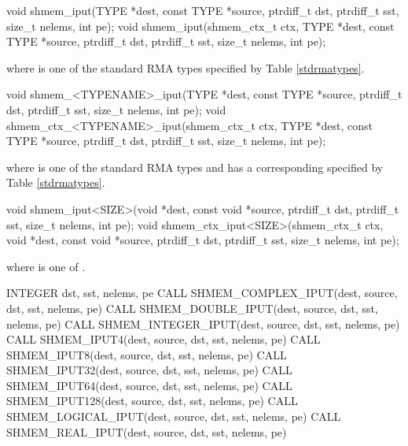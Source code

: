 
\begin{apidefinition}

\begin{C11synopsis}
void shmem_iput(TYPE *dest, const TYPE *source, ptrdiff_t dst, ptrdiff_t sst, size_t nelems, int pe);
void shmem_iput(shmem_ctx_t ctx, TYPE *dest, const TYPE *source, ptrdiff_t dst, ptrdiff_t sst, size_t nelems, int pe);
\end{C11synopsis}
where \TYPE{} is one of the standard \ac{RMA} types specified by Table \ref{stdrmatypes}.

\begin{Csynopsis}
void shmem_<TYPENAME>_iput(TYPE *dest, const TYPE *source, ptrdiff_t dst, ptrdiff_t sst, size_t nelems, int pe);
void shmem_ctx_<TYPENAME>_iput(shmem_ctx_t ctx, TYPE *dest, const TYPE *source, ptrdiff_t dst, ptrdiff_t sst, size_t nelems, int pe);
\end{Csynopsis}
where \TYPE{} is one of the standard \ac{RMA} types and has a corresponding \TYPENAME{} specified by Table \ref{stdrmatypes}.

\begin{CsynopsisCol}
void shmem_iput<SIZE>(void *dest, const void *source, ptrdiff_t dst, ptrdiff_t sst, size_t nelems, int pe);
void shmem_ctx_iput<SIZE>(shmem_ctx_t ctx, void *dest, const void *source, ptrdiff_t dst, ptrdiff_t sst, size_t nelems, int pe);
\end{CsynopsisCol}
where \SIZE{} is one of .

\begin{Fsynopsis}
INTEGER dst, sst, nelems, pe
CALL SHMEM_COMPLEX_IPUT(dest, source, dst, sst, nelems, pe)
CALL SHMEM_DOUBLE_IPUT(dest, source, dst, sst, nelems, pe)
CALL SHMEM_INTEGER_IPUT(dest, source, dst, sst, nelems, pe)
CALL SHMEM_IPUT4(dest, source, dst, sst, nelems, pe)
CALL SHMEM_IPUT8(dest, source, dst, sst, nelems, pe)
CALL SHMEM_IPUT32(dest, source, dst, sst, nelems, pe)
CALL SHMEM_IPUT64(dest, source, dst, sst, nelems, pe)
CALL SHMEM_IPUT128(dest, source, dst, sst, nelems, pe)
CALL SHMEM_LOGICAL_IPUT(dest, source, dst, sst, nelems, pe)
CALL SHMEM_REAL_IPUT(dest, source, dst, sst, nelems, pe)
\end{Fsynopsis}


\end{apidefinition}
